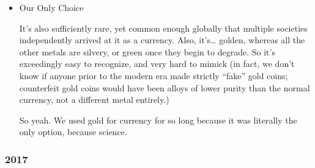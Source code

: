 \documentclass[11pt]{article}
\begin{document}
\begin{itemize}
\begin{itemize}
All of these except gold and silver are VERY VERY rare, and most require, again, modern metallurgy in order to process… all of them except gold and silver. Silver reacts with sulphur in the air, so isn’t ideal as a currency, leaving… gold, which works because it is literally the most boring element (which, fun fact, is also why it’s so shiny, but that’s a different thing.)
\item Our Only Choice
\label{sec:org8cc0958}

It’s also sufficiently rare, yet common enough globally that multiple societies independently arrived at it as a currency. Also, it’s… golden, whereas all the other metals are silvery, or green once they begin to degrade. So it’s exceedingly easy to recognize, and very hard to mimick (in fact, we don’t know if anyone prior to the modern era made strictly “fake” gold coins; counterfeit gold coins would have been alloys of lower purity than the normal currency, not a different metal entirely.)

So yeah. We used gold for currency for so long because it was literally the only option, because science.
\end{itemize}
\end{itemize}
\stopcontents[level-4]
\stopcontents[level-3]
\subsubsection*{2017}
\label{sec:orgafdc6b7}
\startcontents[level-3]
\end{document}
